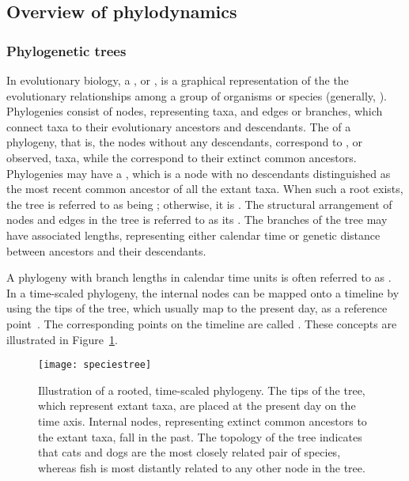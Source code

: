 \subsection{Overview of phylodynamics}

\subsubsection{Phylogenetic trees}

In evolutionary biology, a , or , is a
graphical representation of the the evolutionary relationships among a group of
organisms or species (generally, ). Phylogenies consist of nodes,
representing taxa, and edges or branches, which connect taxa to their
evolutionary ancestors and descendants. The  of a phylogeny, that
is, the nodes without any descendants, correspond to , or
observed, taxa, while the  correspond to their extinct
common ancestors. Phylogenies may have a , which is a node with no
descendants distinguished as the most recent common ancestor of all the extant
taxa. When such a root exists, the tree is referred to as being ;
otherwise, it is . The structural arrangement of nodes and edges
in the tree is referred to as its . The branches of the tree may
have associated lengths, representing either calendar time or genetic distance
between ancestors and their descendants. 

A phylogeny with branch lengths in calendar time units is often referred to as
. In a time-scaled phylogeny, the internal nodes can be
mapped onto a timeline by using the tips of the tree, which usually map to the
present day, as a reference point~\autocite{nee1992tempo}. The corresponding
points on the timeline are called . These concepts are
illustrated in Figure~\ref{fig:speciestree}.

\begin{figure}[ht]
  \centering
  \label{fig:speciestree}
  \texttt{[image: speciestree]}
  \caption[Illustration of a rooted, time-scaled phylogeny]{Illustration of a
    rooted, time-scaled phylogeny. The tips of the tree, which represent extant
    taxa, are placed at the present day on the
    time axis. Internal nodes, representing extinct common ancestors to the
    extant taxa, fall in the past. The topology of the tree indicates that cats
    and dogs are the most closely related pair of species, whereas fish is most
    distantly related to any other node in the tree.}
\end{figure}


